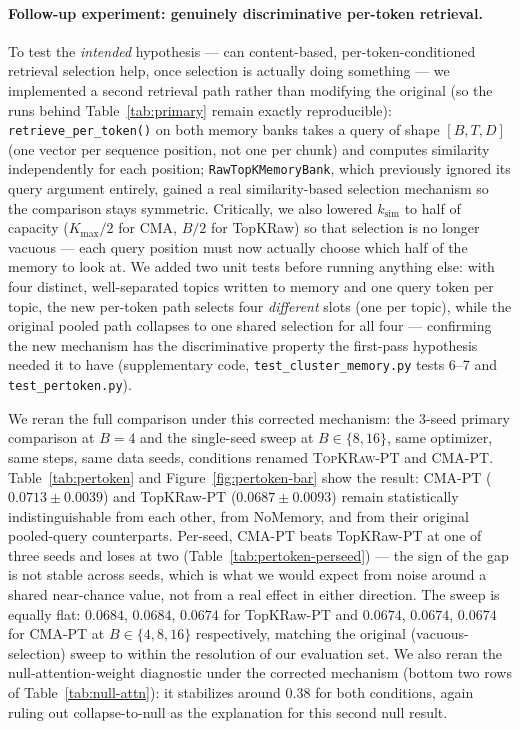 \documentclass[11pt]{article}
\begin{document}
\paragraph{Follow-up experiment: genuinely discriminative per-token retrieval.} To test the
\emph{intended} hypothesis --- can content-based, per-token-conditioned retrieval selection help,
once selection is actually doing something --- we implemented a second retrieval path rather than
modifying the original (so the runs behind Table~\ref{tab:primary} remain exactly reproducible):
\texttt{retrieve\_per\_token()} on both memory banks takes a query of shape $[B,T,D]$ (one vector
per sequence position, not one per chunk) and computes similarity independently for each position;
\texttt{RawTopKMemoryBank}, which previously ignored its query argument entirely, gained a real
similarity-based selection mechanism so the comparison stays symmetric. Critically, we also
lowered $k_{\text{sim}}$ to half of capacity ($K_{\max}/2$ for CMA, $B/2$ for TopKRaw) so that
selection is no longer vacuous --- each query position must now actually choose which half of the
memory to look at. We added two unit tests before running anything else: with four distinct,
well-separated topics written to memory and one query token per topic, the new per-token path
selects four \emph{different} slots (one per topic), while the original pooled path collapses to
one shared selection for all four --- confirming the new mechanism has the discriminative property
the first-pass hypothesis needed it to have (supplementary code, \texttt{test\_cluster\_memory.py}
tests 6--7 and \texttt{test\_pertoken.py}).

We reran the full comparison under this corrected mechanism: the 3-seed primary comparison at
$B{=}4$ and the single-seed sweep at $B \in \{8,16\}$, same optimizer, same steps, same data
seeds, conditions renamed \textsc{TopKRaw-PT} and \textsc{CMA-PT}. Table~\ref{tab:pertoken} and
Figure~\ref{fig:pertoken-bar} show the result: CMA-PT ($0.0713 \pm 0.0039$) and TopKRaw-PT
($0.0687 \pm 0.0093$) remain statistically indistinguishable from each other, from NoMemory, and
from their original pooled-query counterparts. Per-seed, CMA-PT beats TopKRaw-PT at one of three
seeds and loses at two (Table~\ref{tab:pertoken-perseed}) --- the sign of the gap is not stable
across seeds, which is what we would expect from noise around a shared near-chance value, not from
a real effect in either direction. The sweep is equally flat: $0.0684$, $0.0684$, $0.0674$ for
TopKRaw-PT and $0.0674$, $0.0674$, $0.0674$ for CMA-PT at $B \in \{4,8,16\}$ respectively, matching
the original (vacuous-selection) sweep to within the resolution of our evaluation set. We also
reran the null-attention-weight diagnostic under the corrected mechanism (bottom two rows of
Table~\ref{tab:null-attn}): it stabilizes around $0.38$ for both conditions, again ruling out
collapse-to-null as the explanation for this second null result.
\end{document}
